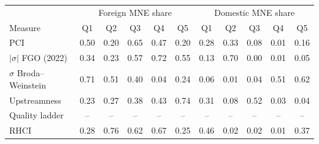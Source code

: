\begin{tabular}{lccccc|ccccc}
\toprule
 & \multicolumn{5}{c}{Foreign MNE share} & \multicolumn{5}{c}{Domestic MNE share} \\
Measure & Q1 & Q2 & Q3 & Q4 & Q5 & Q1 & Q2 & Q3 & Q4 & Q5 \\
\midrule
PCI & 0.50 & 0.20 & 0.65 & 0.47 & 0.20 & 0.28 & 0.33 & 0.08 & 0.01 & 0.16 \\
$|\sigma|$ FGO (2022) & 0.34 & 0.23 & 0.57 & 0.72 & 0.55 & 0.13 & 0.70 & 0.00 & 0.01 & 0.05 \\
$\sigma$ Broda--Weinstein & 0.71 & 0.51 & 0.40 & 0.04 & 0.24 & 0.06 & 0.01 & 0.04 & 0.51 & 0.62 \\
Upstreamness & 0.23 & 0.27 & 0.38 & 0.43 & 0.74 & 0.31 & 0.08 & 0.52 & 0.03 & 0.04 \\
Quality ladder & -- & -- & -- & -- & -- & -- & -- & -- & -- & -- \\
RHCI & 0.28 & 0.76 & 0.62 & 0.67 & 0.25 & 0.46 & 0.02 & 0.02 & 0.01 & 0.37 \\
\bottomrule
\end{tabular}
